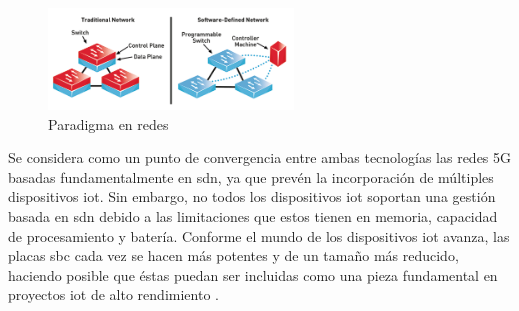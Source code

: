 \begin{figure}[h]
    \centering
    \includegraphics[width=6.5cm]{archivos/img/intro/sdn.png}
    \caption{Paradigma en redes }
    \label{sdnparadigma}
\end{figure}

Se considera como un punto de convergencia entre ambas tecnologías las redes 5G basadas fundamentalmente en \gls{sdn}, ya que prevén la incorporación de múltiples dispositivos \gls{iot}. Sin embargo, no todos los dispositivos \gls{iot} soportan una gestión basada en \gls{sdn} debido a las limitaciones que estos tienen en memoria, capacidad de procesamiento y  batería. Conforme el mundo de los dispositivos \gls{iot} avanza, las placas \gls{sbc} cada vez se hacen más potentes y de un tamaño más reducido, haciendo posible que éstas puedan ser incluidas como una pieza fundamental en proyectos \gls{iot} de alto rendimiento \cite{7501691}. \\

\par


